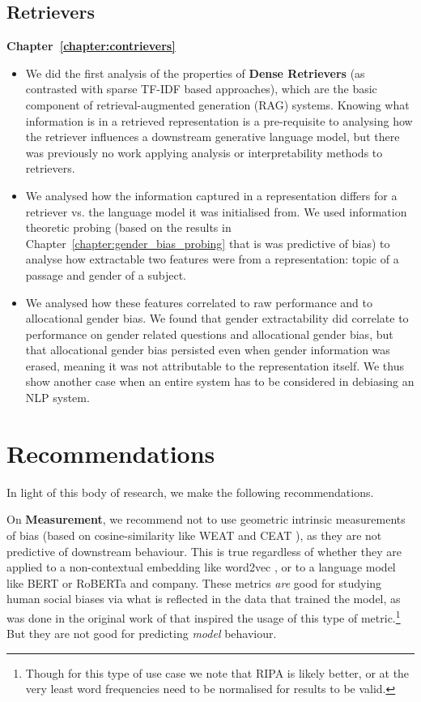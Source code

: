 \subsection{Retrievers}
\textbf{Chapter~\ref{chapter:contrievers}}

\begin{itemize}
    \item We did the first analysis of the properties of \textbf{Dense Retrievers} (as contrasted with sparse TF-IDF based approaches), which are the basic component of retrieval-augmented generation (RAG) systems. Knowing what information is in a retrieved representation is a pre-requisite to analysing how the retriever influences a downstream generative language model, but there was previously no work applying analysis or interpretability methods to retrievers.
    \item We analysed how the information captured in a representation differs for a retriever vs. the language model it was initialised from. We used information theoretic probing (based on the results in Chapter~\ref{chapter:gender_bias_probing} that is was predictive of bias) to analyse how extractable two features were from a representation: topic of a passage and gender of a subject. 
    \item We analysed how these features correlated to raw performance and to allocational gender bias. We found that gender extractability did correlate to performance on gender related questions and allocational gender bias, but that allocational gender bias persisted even when gender information was erased, meaning it was not attributable to the representation itself. We thus show another case when an entire system has to be considered in debiasing an NLP system.
\end{itemize}

\section{Recommendations}
In light of this body of research, we make the following recommendations. 

On \textbf{Measurement}, we recommend not to use geometric intrinsic measurements of bias (based on cosine-similarity like WEAT \citep{Caliskan2017SemanticsDA} and CEAT \citep{guo_and_caliskan}), as they are not predictive of downstream behaviour. This is true regardless of whether they are applied to a non-contextual embedding like word2vec \citep{mikolov_word2vec}, or to a language model like BERT \citep{devlin-etal-2019-bert} or RoBERTa \citep{liu2019roberta} and company. These metrics \textit{are} good for studying human social biases via what is reflected in the data that trained the model, as was done in the original work of \citet{Caliskan2017SemanticsDA} that inspired the usage of this type of metric.\footnote{Though for this type of use case we note that RIPA \citep{ethayarajh-etal-2019-understanding} is likely better, or at the very least word frequencies need to be normalised for results to be valid.} But they are not good for predicting \textit{model} behaviour. 

